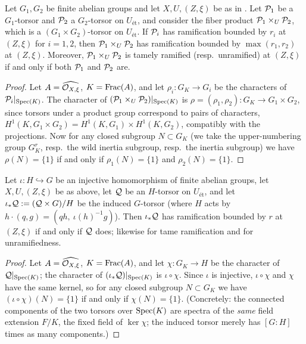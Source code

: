 \begin{lemma}\label{lemma:ramification_of_fiber_product}
    Let $G_1, G_2$ be finite abelian groups and let $X, U, (Z, \xi)$ be as in
    . Let $\mathcal{P}_1$ be a
    $G_1$-torsor and $\mathcal{P}_2$ a $G_2$-torsor on $U_{\text{ét}}$, and consider the fiber
    product $\mathcal{P}_1 \times_U \mathcal{P}_2$, which is a $(G_1 \times G_2)$-torsor on
    $U_{\text{ét}}$. If $\mathcal{P}_i$ has ramification bounded by $r_i$ at $(Z, \xi)$ for
    $i = 1, 2$, then $\mathcal{P}_1 \times_U \mathcal{P}_2$ has ramification bounded by
    $\max(r_1, r_2)$ at $(Z, \xi)$. Moreover, $\mathcal{P}_1 \times_U \mathcal{P}_2$ is tamely
    ramified (resp.\ unramified) at $(Z, \xi)$ if and only if both $\mathcal{P}_1$ and
    $\mathcal{P}_2$ are.
\end{lemma}
\begin{proof}
    Let $A=\widehat{\mathcal{O}_{X, \xi}}$, $K=\operatorname{Frac}(A)$, and let
    $\rho_i: G_K \to G_i$ be the characters of $\mathcal{P}_i|_{\operatorname{Spec}(K)}$. The
    character of $(\mathcal{P}_1 \times_U \mathcal{P}_2)|_{\operatorname{Spec}(K)}$ is
    $\rho = (\rho_1, \rho_2) : G_K \to G_1 \times G_2$, since torsors under a
    product group correspond to pairs of characters,
    $H^1(K, G_1 \times G_2) = H^1(K, G_1) \times H^1(K, G_2)$, compatibly with
    the projections. Now for any closed subgroup $N \subset G_K$ (we take the
    upper-numbering group $G_K^r$, resp.\ the wild inertia subgroup, resp.\ the
    inertia subgroup) we have $\rho(N) = \{1\}$ if and only if
    $\rho_1(N) = \{1\}$ and $\rho_2(N) = \{1\}$.
\end{proof}

\begin{lemma}\label{lemma:ramification_of_induced_torsor}
    Let $\iota : H \hookrightarrow G$ be an injective homomorphism of finite abelian
    groups, let $X, U, (Z, \xi)$ be as above, let $\mathcal{Q}$ be an $H$-torsor on
    $U_{\text{ét}}$, and let $\iota_* \mathcal{Q} := (\mathcal{Q} \times G)/H$ be the induced
    $G$-torsor (where $H$ acts by $h \cdot (q, g) = (qh,\ \iota(h)^{-1}g)$).
    Then $\iota_* \mathcal{Q}$ has ramification bounded by $r$ at $(Z, \xi)$ if and only if
    $\mathcal{Q}$ does; likewise for tame ramification and for unramifiedness.
\end{lemma}
\begin{proof}
    Let $A=\widehat{\mathcal{O}_{X, \xi}}$, $K=\operatorname{Frac}(A)$, and let $\chi: G_K \to H$ be the
    character of $\mathcal{Q}|_{\operatorname{Spec}(K)}$; the character of $(\iota_*\mathcal{Q})|_{\operatorname{Spec}(K)}$ is
    $\iota \circ \chi$. Since $\iota$ is injective, $\iota \circ \chi$ and $\chi$
    have the same kernel, so for any closed subgroup $N \subset G_K$ we have
    $(\iota \circ \chi)(N) = \{1\}$ if and only if $\chi(N) = \{1\}$.
    (Concretely: the connected components of the two torsors over $\operatorname{Spec}(K)$ are
    spectra of the \emph{same} field extension $F/K$, the fixed field of
    $\ker \chi$; the induced torsor merely has $[G : H]$ times as many components.)
\end{proof}

